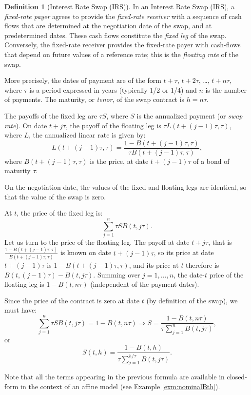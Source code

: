 \documentclass[
  12pt,
]{book}
\theoremstyle{definition}
\newtheorem{definition}{Definition}[chapter]
\theoremstyle{definition}
\theoremstyle{definition}
\theoremstyle{definition}
\theoremstyle{remark}
\begin{document}
\begin{definition}[Interest Rate Swap (IRS)]
\protect\hypertarget{def:swap}{}\label{def:swap}In an Interest Rate Swap (IRS), a \emph{fixed-rate payer} agrees to provide the \emph{fixed-rate receiver} with a sequence of cash flows that are determined at the negotiation date of the swap, and at predetermined dates. These cash flows constitute the \emph{fixed leg} of the swap. Conversely, the fixed-rate receiver provides the fixed-rate payer with cash-flows that depend on future values of a reference rate; this is the \emph{floating rate} of the swap.

More precisely, the dates of payment are of the form \(t+ \tau\), \(t + 2\tau\), \dots, \(t + n\tau\), where \(\tau\) is a period expressed in years (typically 1/2 or 1/4) and \(n\) is the number of payments. The maturity, or \emph{tenor}, of the swap contract is \(h = n \tau\).

The payoffs of the fixed leg are \(\tau S\), where \(S\) is the annualized payment (or \emph{swap rate}). On date \(t+j\tau\), the payoff of the floating leg is \(\tau L(t+(j-1)\tau,\tau)\), where \(L\), the annualized linear rate is given by:
\[
L(t+(j-1)\tau,\tau) = \frac{1 - B(t+(j-1)\tau,\tau)}{\tau B(t+(j-1)\tau,\tau)},
\]
where \(B(t+(j-1)\tau,\tau)\) is the price, at date \(t+(j-1)\tau\) of a bond of maturity \(\tau\).

On the negotiation date, the values of the fixed and floating legs are identical, so that the value of the swap is zero.
\end{definition}

At \(t\), the price of the fixed leg is:
\[
\sum_{j=1}^n \tau S B(t,j\tau).
\]
Let us turn to the price of the floating leg. The payoff at date \(t+j\tau\), that is \(\frac{1 - B(t+(j-1)\tau,\tau)}{B(t+(j-1)\tau,\tau)}\) is known on date \(t+(j-1)\tau\), so its price at date \(t+(j-1)\tau\) is \(1 - B(t+(j-1)\tau,\tau)\), and its price at \(t\) therefore is \(B(t,(j-1)\tau) - B(t,j\tau)\). Summing over \(j=1,\dots,n\), the date-\(t\) price of the floating leg is \(1 - B(t,n\tau)\) (independent of the payment dates).

Since the price of the contract is zero at date \(t\) (by definition of the swap), we must have:
\[
\sum_{j=1}^n \tau S B(t,j\tau) = 1 - B(t,n\tau) \Rightarrow S = \frac{1 - B(t,n\tau)}{ \tau \sum_{j=1}^n  B(t,j\tau)},
\]
or
\[
\boxed{S(t,h) = \frac{1 - B(t,h)}{\tau \sum_{j=1}^{h/\tau}  B(t,j\tau)}.}
\]

Note that all the terms appearing in the previous formula are available in closed-form in the context of an affine model (see Example \ref{exm:nominalBth}).
\end{document}
